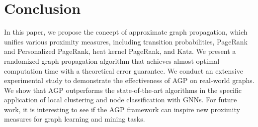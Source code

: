 \vspace{-2mm}
\section{Conclusion} \label{sec:conclusion}
\vspace{-1mm}
In this paper, we propose the concept of approximate graph propagation, which unifies various proximity measures, including transition probabilities, PageRank and Personalized PageRank, heat kernel PageRank, and Katz. We present a randomized graph propagation algorithm that achieves almost optimal computation time with a theoretical error guarantee. We conduct an extensive experimental study to demonstrate the effectiveness of AGP on real-world graphs. We show that AGP outperforms the state-of-the-art algorithms in the specific application of local clustering and node classification with GNNs. For future work, it is interesting to see if the AGP framework can inspire new proximity measures for graph learning and mining tasks.

\vspace{-1mm}



